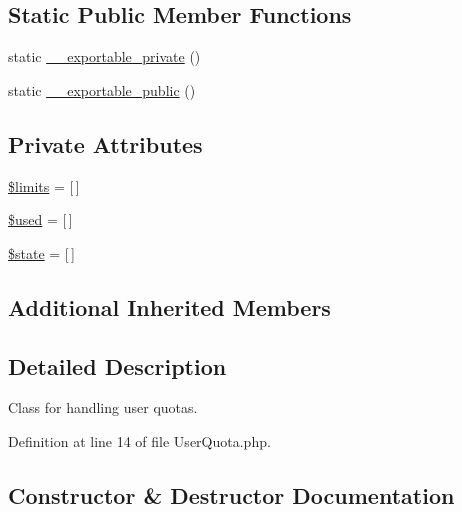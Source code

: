 \subsection*{Static Public Member Functions}
\begin{DoxyCompactItemize}
\item 
static \hyperlink{classlibresignage_1_1common_1_1php_1_1auth_1_1UserQuota_a6c19112d42ad2a383cceed1e48b015b3}{\+\_\+\+\_\+exportable\+\_\+private} ()
\item 
static \hyperlink{classlibresignage_1_1common_1_1php_1_1auth_1_1UserQuota_a9a72cda3548e2dd6af3e4fdf2b143f05}{\+\_\+\+\_\+exportable\+\_\+public} ()
\end{DoxyCompactItemize}
\subsection*{Private Attributes}
\begin{DoxyCompactItemize}
\item 
\hyperlink{classlibresignage_1_1common_1_1php_1_1auth_1_1UserQuota_a589023237166f30a20525b3123908570}{\$limits} = \mbox{[}$\,$\mbox{]}
\item 
\hyperlink{classlibresignage_1_1common_1_1php_1_1auth_1_1UserQuota_aff940a2bb6411ad5eda9628a50458daf}{\$used} = \mbox{[}$\,$\mbox{]}
\item 
\hyperlink{classlibresignage_1_1common_1_1php_1_1auth_1_1UserQuota_ab725193e53a4d5f221820584bff856e3}{\$state} = \mbox{[}$\,$\mbox{]}
\end{DoxyCompactItemize}
\subsection*{Additional Inherited Members}


\subsection{Detailed Description}
Class for handling user quotas. 

Definition at line 14 of file User\+Quota.\+php.



\subsection{Constructor \& Destructor Documentation}
\mbox{\label{classlibresignage_1_1common_1_1php_1_1auth_1_1UserQuota_ab5bcb5536493282f478610e42e3b5962}} 

